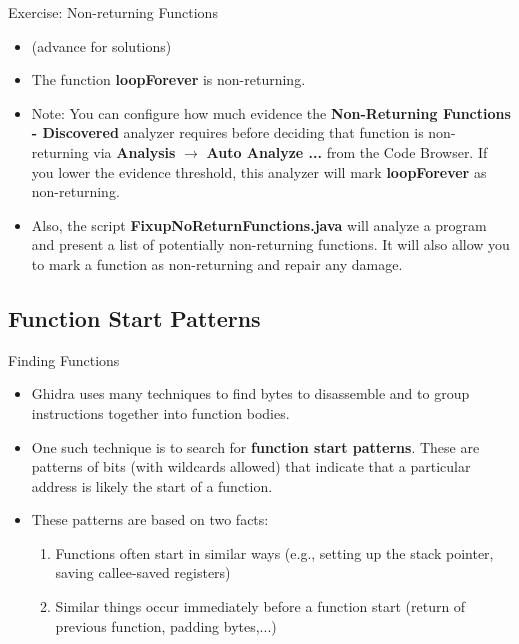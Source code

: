 \documentclass{beamer}
\begin{document}
\begin{frame}
\begin{block}{Exercise: Non-returning Functions}
\begin{itemize}
\item[] (advance for solutions)
\pause
\item The function \textbf{loopForever} is non-returning. 
\item Note: You can configure how much evidence the \textbf{Non-Returning Functions - Discovered} analyzer requires before deciding that function is non-returning via 
\textbf{Analysis} $\rightarrow$ \textbf{Auto Analyze ...} from the Code Browser. If you lower the evidence threshold, this analyzer will mark \textbf{loopForever} as
non-returning.
\item Also, the script \textbf{FixupNoReturnFunctions.java} will analyze a program and present a list of potentially non-returning functions.
It will also allow you to mark a function as non-returning and repair any damage.
\end{itemize}
\end{block}
\end{frame}


\subsection{Function Start Patterns}

\begin{frame}
\begin{block}{Finding Functions}
\begin{itemize}
\item Ghidra uses many techniques to find bytes to disassemble and to group instructions together into function bodies.
\item One such technique is to search for \textbf{function start patterns}.  These are patterns of bits (with wildcards allowed) that indicate that a particular address is likely the
start of a function.
\item These patterns are based on two facts:
\begin{enumerate}
\item Functions often start in similar ways (e.g., setting up the stack pointer, saving callee-saved registers)
\item Similar things occur immediately before a function start (return of previous function, padding bytes,...)
\end{enumerate}
\end{itemize}
\end{block}
\end{frame}
\end{document}

